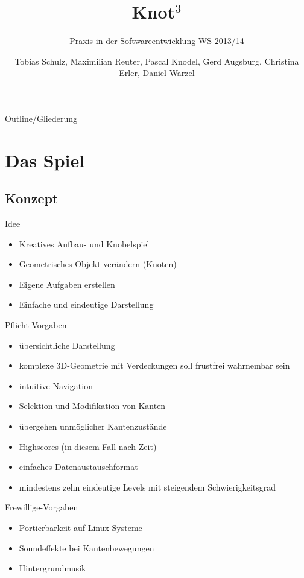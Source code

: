 \documentclass[18pt]{beamer}
\title[Short title]{Knot$^3$ }
\subtitle{Praxis in der Softwareentwicklung WS 2013/14}
\author{ Tobias Schulz, Maximilian Reuter, Pascal Knodel, Gerd Augsburg, Christina Erler, Daniel Warzel}
\institute{Institut für Betriebs- und Dialogsysteme, Lehrstuhl für Computergrafik}
\begin{document}

\begin{frame}
\titlepage
\end{frame}

\begin{frame}{Outline/Gliederung}
\tableofcontents
\end{frame}

\section{Das Spiel}
\subsection{Konzept}
\begin{frame}{Idee}
\begin{itemize}
\item Kreatives Aufbau- und Knobelspiel
\item Geometrisches Objekt verändern (Knoten)
\item Eigene Aufgaben erstellen
\item Einfache und eindeutige Darstellung
\end{itemize}
\end{frame}
\begin{frame}{Pflicht-Vorgaben}
\begin{itemize}
\item übersichtliche Darstellung
\item komplexe 3D-Geometrie mit Verdeckungen soll frustfrei wahrnembar sein
\item intuitive Navigation
\item Selektion und Modifikation von Kanten
\item übergehen unmöglicher Kantenzustände
\item Highscores (in diesem Fall nach Zeit)
\item einfaches Datenaustauschformat
\item mindestens zehn eindeutige Levels mit steigendem Schwierigkeitsgrad
\end{itemize}
\end{frame}

\begin{frame}{Frewillige-Vorgaben}
\begin{itemize}
\item Portierbarkeit auf Linux-Systeme
\item Soundeffekte bei Kantenbewegungen
\item Hintergrundmusik
\end{itemize}
\end{frame}
\end{document}
